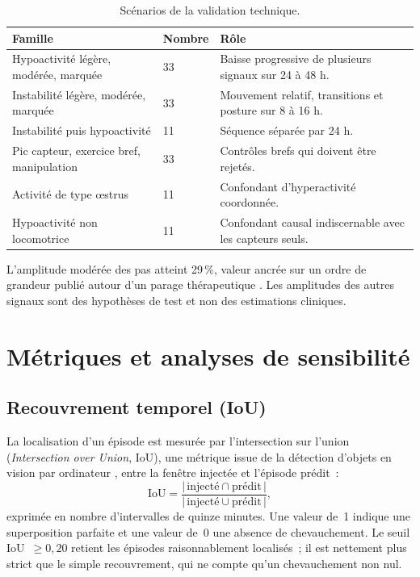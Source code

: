\begin{table}[H]
  \centering
  \caption{Scénarios de la validation technique.}
  \label{tab:profils_detection}
  \small
  \begin{tabular}{p{}p{}p{}}
    \toprule
    Famille & Nombre & Rôle \\
    \midrule
    Hypoactivité légère, modérée, marquée & 33 & Baisse progressive de plusieurs signaux sur 24 à 48 h. \\
    Instabilité légère, modérée, marquée & 33 & Mouvement relatif, transitions et posture sur 8 à 16 h. \\
    Instabilité puis hypoactivité & 11 & Séquence séparée par 24 h. \\
    Pic capteur, exercice bref, manipulation & 33 & Contrôles brefs qui doivent être rejetés. \\
    Activité de type œstrus & 11 & Confondant d'hyperactivité coordonnée. \\
    Hypoactivité non locomotrice & 11 & Confondant causal indiscernable avec les capteurs seuls. \\
    \bottomrule
  \end{tabular}
\end{table}

L'amplitude modérée des pas atteint 29\,\%, valeur ancrée sur un ordre de grandeur publié
autour d'un parage thérapeutique \citep{paudyal2021lying}. Les amplitudes des autres signaux
sont des hypothèses de test et non des estimations cliniques.

\section{Métriques et analyses de sensibilité}

\subsection{Recouvrement temporel (IoU)}

La localisation d'un épisode est mesurée par l'intersection sur l'union
(\textit{Intersection over Union}, IoU), une métrique issue de la détection d'objets en
vision par ordinateur \citep{everingham2010pascal}, entre la fenêtre injectée et l'épisode
prédit~:
\[
\mathrm{IoU} = \frac{|\,\text{injecté} \cap \text{prédit}\,|}{|\,\text{injecté} \cup \text{prédit}\,|},
\]
exprimée en nombre d'intervalles de quinze minutes. Une valeur de~1 indique une superposition
parfaite et une valeur de~0 une absence de chevauchement. Le seuil IoU~$\geq0{,}20$ retient
les épisodes raisonnablement localisés~; il est nettement plus strict que le simple
recouvrement, qui ne compte qu'un chevauchement non nul.

